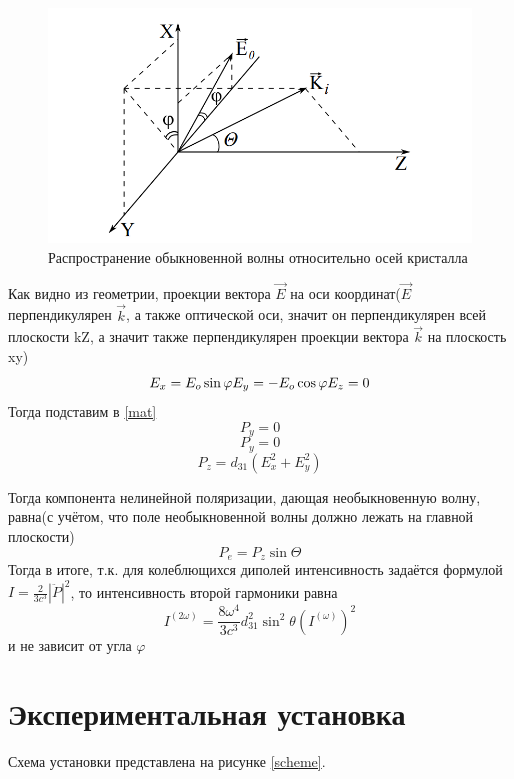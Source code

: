 \documentclass[a4paper,12pt]{article} %
\begin{document}
\begin{figure}[H]
\centering
\includegraphics[scale=1]{pic5.png}
\caption{Распространение обыкновенной волны относительно осей кристалла}
\label{wave}
\end{figure}
Как видно из геометрии, проекции вектора $\vec{E}$ на оси координат($\vec{E}$ перпендикулярен $\vec{k}$, а также оптической оси, значит он перпендикулярен всей плоскости kZ, а значит также перпендикулярен проекции вектора $\vec{k}$ на плоскость xy)
\begin{equation}
E_x = E_o \sin \varphi \\
E_y = - E_o \cos \varphi \\
E_z = 0
\end{equation}
Тогда подставим в \eqref{mat}
\[P_y = 0\]
\begin{equation}
P_y = 0
\end{equation}
\[P_z = d_{31} (E^2_x +E^2_y)\]



Тогда компонента нелинейной поляризации, дающая необыкновенную волну, равна(с учётом, что поле необыкновенной волны должно лежать на главной плоскости)
\begin{equation}
P_e = P_z \sin \Theta
\end{equation}
Тогда в итоге, т.к. для колеблющихся диполей интенсивность задаётся формулой $I = \frac{2}{3c^3} |\ddot{P}|^2$, то интенсивность второй гармоники равна
\begin{equation}
I^{(2\omega)} = \frac{8 \omega^4}{3c^3} d^2_{31} \sin^2 \theta \left( I^{(\omega)} \right)^2
\label{int}
\end{equation}
и не зависит от угла $\varphi$

\section{Экспериментальная установка}
Схема установки представлена на рисунке \ref{scheme}.
\end{document}
